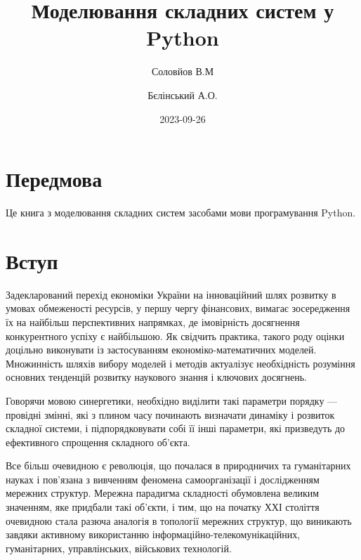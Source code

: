 \documentclass[
  letterpaper,
]{report}
\title{Моделювання складних систем у Python}
\author{Соловйов В.М \and Бєлінський А.О.}
\date{2023-09-26}
\renewcommand*\contentsname{Зміст}
\newcommand\contentsname{Зміст}
\begin{document}
\maketitle
\ifdefined\Shaded\renewenvironment{Shaded}{\begin{tcolorbox}[boxrule=0pt, frame hidden, sharp corners, borderline west={3pt}{0pt}{shadecolor}, interior hidden, breakable, enhanced]}{\end{tcolorbox}}\fi

\renewcommand*\contentsname{Зміст}
{
\hypersetup{linkcolor=}
\setcounter{tocdepth}{2}
\tableofcontents
}

\hypertarget{ux43fux435ux440ux435ux434ux43cux43eux432ux430}{%
\chapter*{Передмова}\label{ux43fux435ux440ux435ux434ux43cux43eux432ux430}}


Це книга з моделювання складних систем засобами мови програмування
Python.


\hypertarget{ux432ux441ux442ux443ux43f}{%
\chapter{Вступ}\label{ux432ux441ux442ux443ux43f}}

Задекларований перехід економіки України на інноваційний шлях розвитку в
умовах обмеженості ресурсів, у першу чергу фінансових, вимагає
зосередження їх на найбільш перспективних напрямках, де імовірність
досягнення конкурентного успіху є найбільшою. Як свідчить практика,
такого роду оцінки доцільно виконувати із застосуванням
економіко-математичних моделей. Множинність шляхів вибору моделей і
методів актуалізує необхідність розуміння основних тенденцій розвитку
наукового знання і ключових досягнень.

Говорячи мовою синергетики, необхідно виділити такі параметри порядку
--- провідні змінні, які з плином часу починають визначати динаміку і
розвиток складної системи, і підпорядковувати собі її інші параметри,
які призведуть до ефективного спрощення складного об'єкта.

Все більш очевидною є революція, що почалася в природничих та
гуманітарних науках і пов'язана з вивченням феномена самоорганізації і
дослідженням мережних структур. Мережна парадигма складності обумовлена
великим значенням, яке придбали такі об'єкти, і тим, що на початку ХХІ
століття очевидною стала разюча аналогія в топології мережних структур,
що виникають завдяки активному використанню
інформаційно-телекомунікаційних, гуманітарних, управлінських, військових
технологій.
\end{document}
